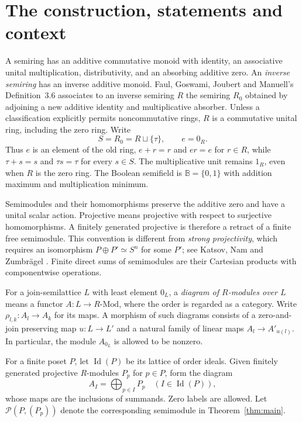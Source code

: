 \documentclass[11pt]{amsart}
\newcommand{\B}{\mathbb B}
\newcommand{\Mod}{\mathrm{Mod}}
\DeclareMathOperator{\Id}{Id}
\theoremstyle{definition}
\theoremstyle{remark}
\begin{document}
\section{The construction, statements and context}
A semiring has an additive commutative monoid with identity, an associative unital multiplication, distributivity, and an absorbing additive zero. An \emph{inverse semiring} has an inverse additive monoid. Faul, Goswami, Joubert and Manuell's Definition~3.6 \cite{FGJM} associates to an inverse semiring $R$ the semiring $R_0$ obtained by adjoining a new additive identity and multiplicative absorber. Unless a classification explicitly permits noncommutative rings, $R$ is a commutative unital ring, including the zero ring. Write
\[
 S=R_0=R\sqcup\{\tau\},\qquad e=0_R.
\]
Thus $e$ is an element of the old ring, $e+r=r$ and $er=e$ for $r\in R$, while $\tau+s=s$ and $\tau s=\tau$ for every $s\in S$. The multiplicative unit remains $1_R$, even when $R$ is the zero ring. The Boolean semifield is $\B=\{0,1\}$ with addition maximum and multiplication minimum.

Semimodules and their homomorphisms preserve the additive zero and have a unital scalar action. Projective means projective with respect to surjective homomorphisms. A finitely generated projective is therefore a retract of a finite free semimodule. This convention is different from \emph{strong projectivity}, which requires an isomorphism $P\oplus P'\simeq S^n$ for some $P'$; see Katsov, Nam and Zumbr\"agel \cite[Definition~4.1]{KNZ}. Finite direct sums of semimodules are their Cartesian products with componentwise operations.

For a join-semilattice $L$ with least element $0_L$, a \emph{diagram of $R$-modules over $L$} means a functor $A:L\to R\text{-}\Mod$, where the order is regarded as a category. Write $\rho_{l,k}:A_l\to A_k$ for its maps. A morphism of such diagrams consists of a zero-and-join preserving map $u:L\to L'$ and a natural family of linear maps $A_l\to A'_{u(l)}$. In particular, the module $A_{0_L}$ is allowed to be nonzero.

For a finite poset $P$, let $\Id(P)$ be its lattice of order ideals. Given finitely generated projective $R$-modules $P_p$ for $p\in P$, form the diagram
\begin{equation}\label{eq:labelled}
 A_I=\bigoplus_{p\in I}P_p\quad (I\in\Id(P)),
\end{equation}
whose maps are the inclusions of summands. Zero labels are allowed. Let $\mathcal P(P,(P_p))$ denote the corresponding semimodule in Theorem~\ref{thm:main}.
\end{document}
